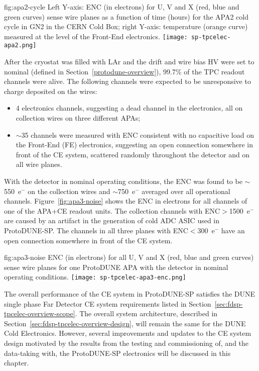 \begin{dunefigure}
{fig:apa2-cycle}
{Left Y-axis: ENC (in electrons) for U, V and X (red, blue and green curves) sense wire planes as a function of time (hours) for the APA2 cold cycle in GN2 in the CERN Cold Box; right Y-axis: temperature (orange curve) measured at the level of the Front-End electronics.}
\texttt{[image: sp-tpcelec-apa2.png]}
\end{dunefigure}

After the cryostat was filled with LAr and the drift and wire bias HV were set to nominal (defined in Section~\ref{protodune-overview}), 99.7\% of the TPC readout channels were alive. The following channels were expected to be unresponsive to charge deposited on the wires:
\begin{itemize}
\item 4 electronics channels, suggesting a dead channel in the electronics, all on collection wires on three different APAs;
\item $\sim$35 channels were measured with ENC consistent with no capacitive load on the Front-End (FE) electronics, suggesting an open connection somewhere in front of the CE system, scattered randomly throughout the detector and on all wire planes.
\end{itemize}
With the detector in nominal operating conditions, the ENC was found to be $\sim$550~e$^-$ on the collection wires and $\sim$750~e$^-$ averaged over all operational channels. Figure~\ref{fig:apa3-noise} shows the ENC in electrons for all channels of one of the APA+CE readout units. The collection channels with ENC$>$1500~e$^-$ are caused by an artifact in the generation of cold ADC ASIC used in ProtoDUNE-SP. The channels in all three planes with ENC$<$300~e$^-$ have an open connection somewhere in front of the CE system.

\begin{dunefigure}
{fig:apa3-noise}
{ENC (in electrons) for all U, V and X (red, blue and green curves) sense wire planes for one ProtoDUNE APA with the detector in nominal operating conditions.}
\texttt{[image: sp-tpcelec-apa3-enc.png]}
\end{dunefigure}

The overall performance of the CE system in ProtoDUNE-SP satisfies the DUNE single phase Far Detector CE system requirements listed in Section~\ref{sec:fdsp-tpcelec-overview-scope}. The overall system architecture, described in Section~\ref{sec:fdsp-tpcelec-overview-design}, will remain the same for the DUNE Cold Electronics. However, several improvements and updates to the CE system design motivated by the results from the testing and commissioning of, and the data-taking with, the ProtoDUNE-SP electronics will be discussed in this chapter.
